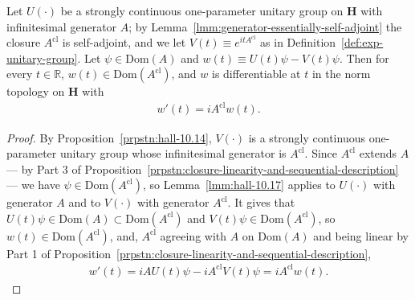 \begin{lemma}
    \label{lmm:orbit-difference-hasDerivAt}
    \leanok
    Let $U(\cdot)$ be a strongly continuous one-parameter unitary group on $\mathbf{H}$ with infinitesimal generator $A$; by Lemma~\ref{lmm:generator-essentially-self-adjoint} the closure $A^{\text{cl}}$ is self-adjoint, and we let $V(t) \equiv e^{itA^{\text{cl}}}$ as in Definition~\ref{def:exp-unitary-group}. Let $\psi \in \text{Dom}(A)$ and $w(t) \equiv U(t)\psi - V(t)\psi$. Then for every $t \in \mathbb{R}$, $w(t) \in \text{Dom}(A^{\text{cl}})$, and $w$ is differentiable at $t$ in the norm topology on $\mathbf{H}$ with
    \begin{align}
        w'(t) = iA^{\text{cl}}w(t).
    \end{align}
\end{lemma}
\begin{proof}
    \leanok
By Proposition~\ref{prpstn:hall-10.14}, $V(\cdot)$ is a strongly continuous one-parameter unitary group whose infinitesimal generator is $A^{\text{cl}}$. Since $A^{\text{cl}}$ extends $A$ — by Part 3 of Proposition~\ref{prpstn:closure-linearity-and-sequential-description} — we have $\psi \in \text{Dom}(A^{\text{cl}})$, so Lemma~\ref{lmm:hall-10.17} applies to $U(\cdot)$ with generator $A$ and to $V(\cdot)$ with generator $A^{\text{cl}}$. It gives that $U(t)\psi \in \text{Dom}(A) \subset \text{Dom}(A^{\text{cl}})$ and $V(t)\psi \in \text{Dom}(A^{\text{cl}})$, so $w(t) \in \text{Dom}(A^{\text{cl}})$, and, $A^{\text{cl}}$ agreeing with $A$ on $\text{Dom}(A)$ and being linear by Part 1 of Proposition~\ref{prpstn:closure-linearity-and-sequential-description},
\begin{align}
    w'(t) = iAU(t)\psi - iA^{\text{cl}}V(t)\psi = iA^{\text{cl}}w(t).
\end{align}
\end{proof}

